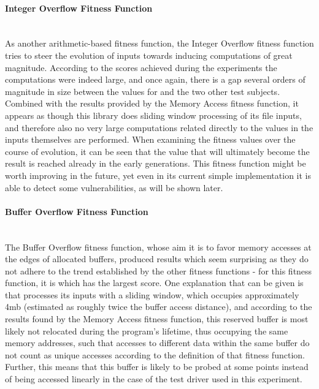 \paragraph{Integer Overflow Fitness Function} ~\\
As another arithmetic-based fitness function, the Integer Overflow fitness function tries to steer the
evolution of inputs towards inducing computations of great magnitude. According to the scores achieved during
the experiments the computations were indeed large, and once again, there is a gap several orders of
magnitude in size between the values for \libpcap and the two other test subjects. Combined with the
results provided by the Memory Access fitness function, it appears as though this library does sliding window
processing of its file inputs, and therefore also no very large computations related directly to the values in
the inputs themselves are performed. When examining the fitness values over the course of evolution, it can
be seen that the value that will ultimately become the result is reached already in the early generations.
This fitness function might be worth improving in the future, yet even in its current simple implementation it
is able to detect some vulnerabilities, as will be shown later.
 
\paragraph{Buffer Overflow Fitness Function} ~\\
The Buffer Overflow fitness function, whose aim it is to favor memory accesses at the edges of allocated
buffers, produced results which seem surprising as they do not adhere to the trend established by the other
fitness functions - for this fitness function, it is \libpcap which has the largest score. One explanation
that can be given is that \libpcap processes its inputs with a sliding window, which occupies approximately
4mb (estimated as roughly twice the buffer access distance), and according to the results found by the Memory
Access fitness function, this reserved buffer is most likely not relocated during the program's lifetime, thus
occupying the same memory addresses, such that accesses to different data within the same buffer do not count
as unique accesses according to the definition of that fitness function. Further, this means that this buffer
is likely to be probed at some points instead of being accessed linearly in the case of the test driver used
in this experiment. 

